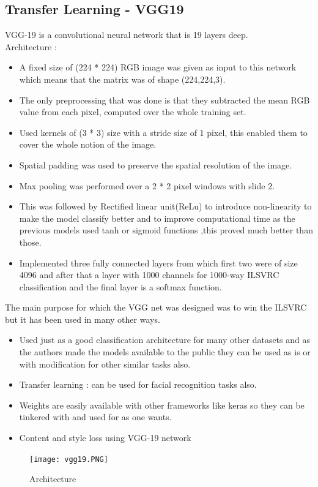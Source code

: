 \subsection{Transfer Learning - VGG19}
VGG-19 is a convolutional neural network that is 19 layers deep.\\
Architecture :
 \begin{itemize}
     \item A fixed size of (224 * 224) RGB image was given as input to this network which means that the matrix was of shape (224,224,3).
     \item The only preprocessing that was done is that they subtracted the mean RGB value from each pixel, computed over the whole training set.
     \item Used kernels of (3 * 3) size with a stride size of 1 pixel, this enabled them to cover the whole notion of the image.
     \item Spatial padding was used to preserve the spatial resolution of the image.
     \item Max pooling was performed over a 2 * 2 pixel windows with slide 2.
     \item This was followed by Rectified linear unit(ReLu) to introduce non-linearity to make the model classify better and to improve computational time as the previous models used tanh or sigmoid functions ,this proved much better than those.
     \item Implemented three fully connected layers from which first two were of size 4096 and after that a layer with 1000 channels for 1000-way ILSVRC classification and the final layer is a softmax function.
\end{itemize}
The main purpose for which the VGG net was designed was to win the ILSVRC but it has been used in many other ways.
\begin{itemize}
    \item Used just as a good classification architecture for many other datasets and as the authors made the models available to the public they can be used as is or with modification for other similar tasks also.
    \item Transfer learning : can be used for facial recognition tasks also.
    \item Weights are easily available with other frameworks like keras so they can be tinkered with and used for as one wants.
    \item Content and style loss using VGG-19 network
\end{itemize}
 \begin{figure}[h]
\label{ss}
\centering
\texttt{[image: vgg19.PNG]}
\caption{Architecture}
\end{figure}
 
